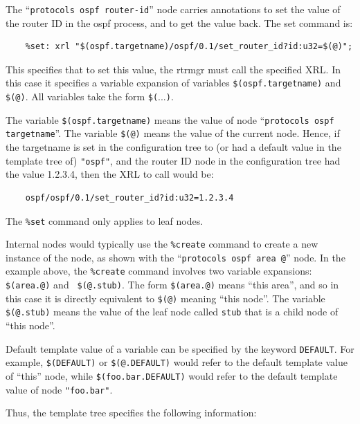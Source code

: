 \documentclass[11pt]{article}
\begin{document}
The ``{\tt protocols ospf router-id}'' node carries annotations to set
the value of the router ID in the ospf process, and to get the value
back.  The set command is:
\begin{verbatim}
    %set: xrl "$(ospf.targetname)/ospf/0.1/set_router_id?id:u32=$(@)";
\end{verbatim}
This specifies that to set this value, the rtrmgr must call the
specified XRL.  In this case it specifies a variable expansion of
variables {\tt \$(ospf.targetname)} and  {\tt \$(@)}.  All variables take the
form {\tt \$(}...{\tt )}.

The variable {\tt \$(ospf.targetname)} means the value of node
``{\tt protocols ospf targetname}''.
The variable {\tt \$(@)} means the value of the current node.
Hence, if the targetname is set in the configuration tree to (or had a default
value in the template tree of) {\tt "ospf"}, and the router ID node in the
configuration tree had the value 1.2.3.4, then the XRL to call would be:

\begin{verbatim}
    ospf/ospf/0.1/set_router_id?id:u32=1.2.3.4
\end{verbatim}

The {\tt \%set} command only applies to leaf nodes.

Internal nodes would typically use the {\tt \%create} command to
create a new instance of the node, as shown with the ``{\tt protocols ospf
area @}'' node.  In the example above, the {\tt \%create} command
involves two variable expansions: {\tt \$(area.@)} and {\tt
\$(@.stub)}.  The form {\tt \$(area.@)} means ``this area'', and so
in this case it is directly equivalent to {\tt \$(@)} meaning ``this node''.
The variable {\tt \$(@.stub)} means the value of the leaf node called
{\tt stub} that is a child node of ``this node''.

Default template value of a variable can be specified by the keyword
{\tt DEFAULT}. For example, {\tt \$(DEFAULT)} or {\tt \$(@.DEFAULT)}
would refer to the default template value of ``this'' node, while
{\tt \$(foo.bar.DEFAULT)} would refer to the default template value
of node {\tt "foo.bar"}.

Thus, the template tree specifies the following information:
\end{document}
